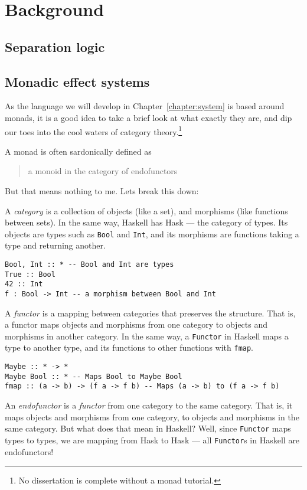\chapter{Background}\label{chapter:background}

\section{Separation logic}

\section{Monadic effect systems}
As the language we will develop in Chapter~\ref{chapter:system} is
based around monads, it is a good idea to take a brief look at what
exactly they are, and dip our toes into the cool waters of category
theory.\footnote{No dissertation is complete without a monad
  tutorial.}

A monad is often sardonically defined as
\begin{quote}
  a monoid in the category of endofunctors
\end{quote}
But that means nothing to me. Lets break this down:

A \textit{category} is a collection of objects (like a set), and
morphisms (like functions between sets). In the same way, Haskell has
\textsf{Hask} --- the category of types. Its objects are types such as
\texttt{Bool} and \texttt{Int}, and its
morphisms are functions taking a type and returning another.
\begin{verbatim}
Bool, Int :: * -- Bool and Int are types
True :: Bool
42 :: Int
f : Bool -> Int -- a morphism between Bool and Int
\end{verbatim}
A \textit{functor} is a mapping between categories that
preserves the structure. That is, a functor maps objects and morphisms
from one category to objects and morphisms in another category.
In the same way, a \texttt{Functor} in Haskell maps a
type to another type, and its functions to other functions with
\texttt{fmap}. 
\begin{verbatim}
Maybe :: * -> *
Maybe Bool :: * -- Maps Bool to Maybe Bool
fmap :: (a -> b) -> (f a -> f b) -- Maps (a -> b) to (f a -> f b)
\end{verbatim}

An \textit{endofunctor} is a \textit{functor} from one category to the
same category. That is, it maps objects and morphisms from one
category, to objects and morphisms in the same category. But what does
that mean in Haskell? Well, since \texttt{Functor} maps
types to types, we are mapping from \textsf{Hask} to \textsf{Hask} ---
all \texttt{Functor}s in Haskell are endofunctors!

